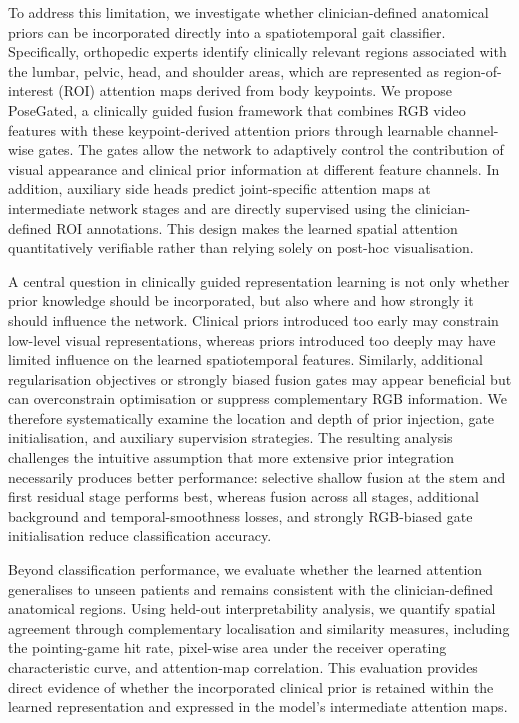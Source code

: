 \documentclass[review,authoryear,times]{elsarticle}
\begin{document}
To address this limitation, we investigate whether clinician-defined anatomical priors can be incorporated directly into a spatiotemporal gait classifier. Specifically, orthopedic experts identify clinically relevant regions associated with the lumbar, pelvic, head, and shoulder areas, which are represented as region-of-interest (ROI) attention maps derived from body keypoints. We propose PoseGated, a clinically guided fusion framework that combines RGB video features with these keypoint-derived attention priors through learnable channel-wise gates. The gates allow the network to adaptively control the contribution of visual appearance and clinical prior information at different feature channels. In addition, auxiliary side heads predict joint-specific attention maps at intermediate network stages and are directly supervised using the clinician-defined ROI annotations. This design makes the learned spatial attention quantitatively verifiable rather than relying solely on post-hoc visualisation.

A central question in clinically guided representation learning is not only whether prior knowledge should be incorporated, but also where and how strongly it should influence the network. Clinical priors introduced too early may constrain low-level visual representations, whereas priors introduced too deeply may have limited influence on the learned spatiotemporal features. Similarly, additional regularisation objectives or strongly biased fusion gates may appear beneficial but can overconstrain optimisation or suppress complementary RGB information. We therefore systematically examine the location and depth of prior injection, gate initialisation, and auxiliary supervision strategies. The resulting analysis challenges the intuitive assumption that more extensive prior integration necessarily produces better performance: selective shallow fusion at the stem and first residual stage performs best, whereas fusion across all stages, additional background and temporal-smoothness losses, and strongly RGB-biased gate initialisation reduce classification accuracy.

Beyond classification performance, we evaluate whether the learned attention generalises to unseen patients and remains consistent with the clinician-defined anatomical regions. Using held-out interpretability analysis, we quantify spatial agreement through complementary localisation and similarity measures, including the pointing-game hit rate, pixel-wise area under the receiver operating characteristic curve, and attention-map correlation. This evaluation provides direct evidence of whether the incorporated clinical prior is retained within the learned representation and expressed in the model's intermediate attention maps.
\end{document}
